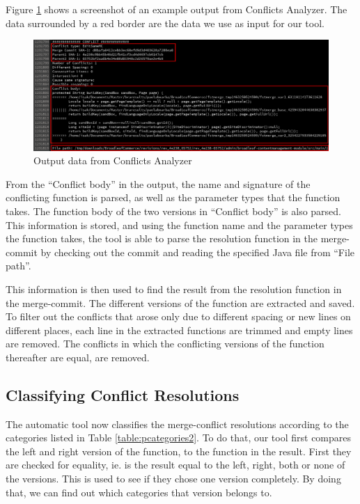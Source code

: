 Figure \ref{fig:screenshot} shows a screenshot of an example output from Conflicts Analyzer. The data surrounded by a red border are the data we use as input for our tool.
\begin{figure}[H]
\centering
\includegraphics[width=400pt]{figure/screenshot.png}
\caption{Output data from Conflicts Analyzer}\label{fig:screenshot}
\end{figure}

From the “Conflict body” in the output, the name and signature of the conflicting function is parsed, as well as the parameter types that the function takes. The function body of the two versions in “Conflict body” is also parsed. This information is stored, and using the function name and the parameter types the function takes, the tool is able to parse the resolution function in the merge-commit by checking out the commit and reading the specified Java file from “File path”.

This information is then used to find the result from the resolution function in the merge-commit. The different versions of the function are extracted and saved. To filter out the conflicts that arose only due to different spacing or new lines on different places, each line in the extracted functions are trimmed and empty lines are removed. The conflicts in which the conflicting versions of the function thereafter are equal, are removed.

\subsection{Classifying Conflict Resolutions}
The automatic tool now classifies the merge-conflict resolutions according to the categories listed in Table \ref{table:pcategories2}. To do that, our tool first compares the left and right version of the function, to the function in the result. First they are checked for equality, ie. is the result equal to the left, right, both or none of the versions. This is used to see if they chose one version completely. By doing that, we can find out which categories that version belongs to.

